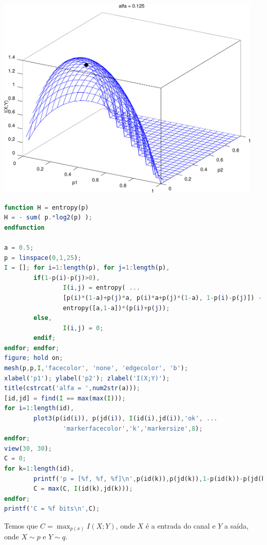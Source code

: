 \begin{questions}
\begin{solution}
\begin{parts}
\begin{minipage}{0.3\textwidth}
\includegraphics[width=0.95\textwidth]{../images/plot01a0125.pdf}
\end{minipage}

\begin{lstlisting}[language=Octave]
function H = entropy(p)
H = - sum( p.*log2(p) );
endfunction

a = 0.5;
p = linspace(0,1,25);
I = []; for i=1:length(p), for j=1:length(p), 
        if(1-p(i)-p(j)>0), 
                I(i,j) = entropy( ... 
                [p(i)*(1-a)+p(j)*a, p(i)*a+p(j)*(1-a), 1-p(i)-p(j)]) - ...
                entropy([a,1-a])*(p(i)+p(j)); 
        else, 
                I(i,j) = 0; 
        endif; 
endfor; endfor;
figure; hold on;
mesh(p,p,I,'facecolor', 'none', 'edgecolor', 'b');
xlabel('p1'); ylabel('p2'); zlabel('I(X;Y)');
title(cstrcat('alfa = ',num2str(a)));
[id,jd] = find(I == max(max(I)));
for i=1:length(id), 
        plot3(p(id(i)), p(jd(i)), I(id(i),jd(i)),'ok', ... 
                'markerfacecolor','k','markersize',8); 
endfor;
view(30, 30);
C = 0;
for k=1:length(id), 
        printf('p = [%f, %f, %f]\n',p(id(k)),p(jd(k)),1-p(id(k))-p(jd(k))); 
        C = max(C, I(id(k),jd(k))); 
endfor;
printf('C = %f bits\n',C);
\end{lstlisting}

Temos que $C = \max_{p(x)} I(X;Y)$, onde $X$ é a entrada do canal e $Y$ a saída, onde
$X \sim p$ e $Y \sim q$.


\end{parts}
\end{solution}
\end{questions}
